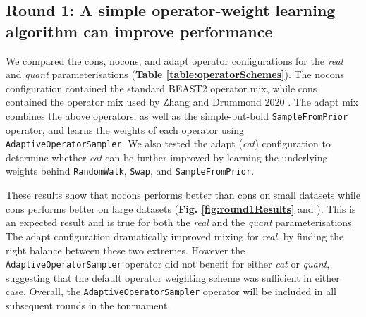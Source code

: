 \documentclass[10pt,letterpaper]{article}
\begin{document}
\clearpage
\subsection*{Round 1: A simple operator-weight learning algorithm can improve performance}

We compared the cons, nocons, and adapt operator configurations for the \textit{real} and \textit{quant} parameterisations (\textbf{Table \ref{table:operatorSchemes}}). 
The nocons configuration contained the standard BEAST2 operator mix, while cons contained the operator mix used by Zhang and Drummond 2020 \cite{zhang2020improving}. 
The adapt mix combines the above operators, as well as the simple-but-bold \texttt{SampleFromPrior} operator, and learns the weights of each operator using  \texttt{AdaptiveOperatorSampler}.
We also tested the adapt (\textit{cat}) configuration to determine whether \textit{cat} can be further improved by learning the underlying weights behind \texttt{RandomWalk}, \texttt{Swap}, and \texttt{SampleFromPrior}.


These results show that nocons performs better than cons on small datasets while cons performs better on large datasets (\textbf{Fig. \ref{fig:round1Results}} and \textbf{}). 
This is an expected result and is true for both the \textit{real} and the \textit{quant} parameterisations.
The adapt configuration dramatically improved mixing for \textit{real}, by finding the right balance between these two extremes.
However the \texttt{AdaptiveOperatorSampler} operator did not benefit for either \textit{cat} or \textit{quant}, suggesting that the default operator weighting scheme was sufficient in either case.
Overall, the \texttt{AdaptiveOperatorSampler} operator will be included in all subsequent rounds in the tournament. 
\end{document}
